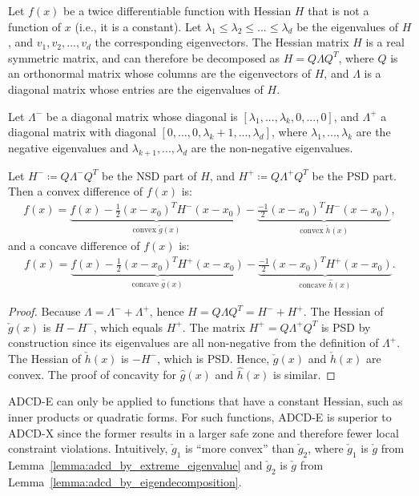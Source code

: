 \begin{lemma} \label{lemma:adcd_by_eigendecomposition}
Let $f(x)$ be a twice differentiable function with Hessian $H$ that is not a function of $x$ (i.e., it is a constant).
Let $\lambda_1 \le \lambda_2 \le ... \le \lambda_d$ be the eigenvalues of $H$, and $v_1, v_2, ..., v_d$ the corresponding eigenvectors.
The Hessian matrix $H$ is a real symmetric matrix, and can therefore be decomposed as $H=Q \Lambda Q^T$, where $Q$ is an orthonormal matrix whose columns are the eigenvectors of $H$, and $\Lambda$ is a diagonal matrix whose entries are the eigenvalues of $H$.

Let $\Lambda^-$ be a diagonal matrix whose diagonal is $[\lambda_1,...,\lambda_k, 0, ..., 0]$, and $\Lambda^+$ a diagonal matrix with diagonal $[0, ..., 0, \lambda_k+1,...,\lambda_d]$,
where $\lambda_1,...,\lambda_k$ are the negative eigenvalues and $\lambda_{k+1},...,\lambda_d$ are the non-negative eigenvalues.

Let $H^- \coloneqq Q \Lambda^- Q^T$ be the NSD part of $H$, and $H^+ \coloneqq Q \Lambda^+ Q^T$ be the PSD part.
Then a convex difference of $f(x)$ is:
\begin{align*}
f(x) = \underbrace{f(x)-\frac{1}{2} (x-x_0)^T H^- (x-x_0)}_{\text{convex }\check{g}(x)} - \underbrace{ \frac{-1}{2} (x-x_0)^T H^- (x-x_0)}_{\text{convex }\check{h}(x)},
\end{align*}
and a concave difference of $f(x)$ is:
\begin{align*}
f(x) = \underbrace{f(x)- \frac{1}{2} (x-x_0)^T H^+ (x-x_0)}_{\text{concave }\hat{g}(x)} - \underbrace{\frac{-1}{2} (x-x_0)^T H^+ (x-x_0)}_{\text{concave }\hat{h}(x)}.
\end{align*}
\end{lemma}


\begin{proof}
    Because $\Lambda = \Lambda^- + \Lambda^+$, hence $H = Q \Lambda Q^T = H^- + H^+$.
	The Hessian of $\check{g}(x)$ is $H - H^-$, which equals $H^+$.
	The matrix $H^+ = Q \Lambda^+ Q^T$ is PSD by construction since its eigenvalues are all non-negative from the definition of $\Lambda^+$.
	The Hessian of $\check{h}(x)$ is $-H^-$, which is PSD.
	Hence, $\check{g}(x)$ and $\check{h}(x)$ are convex.
	The proof of concavity for $\hat{g}(x)$ and $\hat{h}(x)$ is similar.
\end{proof}

ADCD-E can only be applied to functions that have a constant Hessian, such as inner products or quadratic forms.
For such functions, ADCD-E is superior to ADCD-X since the former results in a larger safe zone and therefore fewer local constraint violations.
Intuitively, $\check{g}_{1}$ is ``more convex'' than $\check{g}_{2}$,
where $\check{g}_{1}$ is $\check{g}$ from Lemma~\ref{lemma:adcd_by_extreme_eigenvalue} and $\check{g}_{2}$ is $\check{g}$ from Lemma~\ref{lemma:adcd_by_eigendecomposition}.

